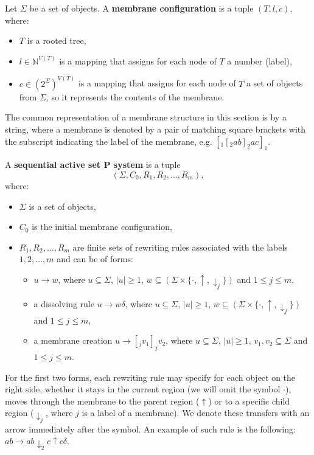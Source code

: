   \begin{definition}
    Let $\Sigma$ be a set of objects. A {\bf membrane configuration} is a tuple $(T, l, c)$, where:
    \begin{itemize}
      \item $T$ is a rooted tree,
      \item $l\in\mathbb N^{V(T)}$ is a mapping that assigns for each node of $T$ a number (label),
      \item $c\in(2^\Sigma)^{V(T)}$ is a mapping that assigns for each node of $T$ a set of objects from $\Sigma$, so it represents the contents of the membrane.
    \end{itemize}
  \end{definition}

  The common representation of a membrane structure in this section is by a string, where a membrane is denoted by a pair of matching square brackets with the subscript indicating the label of the membrane, e.g. $[_1 [_2 ab ]_2 ac ]_1$.

  \begin{definition}
  \label{def:sequential_active_p_system}
    A {\bf sequential active set P system} is a tuple $$(\Sigma, C_0, R_1, R_2, \dots , R_m),$$ where:
    \begin{itemize}
      \item $\Sigma$ is a set of objects,
      \item $C_0$ is the initial membrane configuration,
      \item $R_1,R_2,\dots, R_m$ are finite sets of rewriting rules associated with the labels $1,2,\dots,m$ and can be of forms:
      \begin{itemize}
        \item $u\rightarrow w$, where $u\subseteq \Sigma$, $|u|\geq 1$, $w\subseteq (\Sigma\times\{\cdot, \uparrow, \downarrow_j\})$ and $1\leq j\leq m$,
        \item a dissolving rule $u\rightarrow w\delta$, where $u\subseteq \Sigma$, $|u|\geq 1$, $w\subseteq (\Sigma\times\{\cdot, \uparrow, \downarrow_j\})$ and $1\leq j\leq m$,
        \item a membrane creation $u\rightarrow [_j v_1]_j v_2$, where $u\subseteq \Sigma$, $|u|\geq 1$, $v_1, v_2\subseteq \Sigma$ and $1\leq j\leq m$.
      \end{itemize}
    \end{itemize}
  \end{definition}

  For the first two forms, each rewriting rule may specify for each object on the right side, whether it stays in the current region (we will omit the symbol $\cdot$), moves through the membrane to the parent region ($\uparrow$) or to a specific child region ($\downarrow_j$, where $j$ is a label of a membrane).
  We denote these transfers with an arrow immediately after the symbol.
  An example of such rule is the following: $ab\rightarrow ab\downarrow_2 c\uparrow c\delta$.

